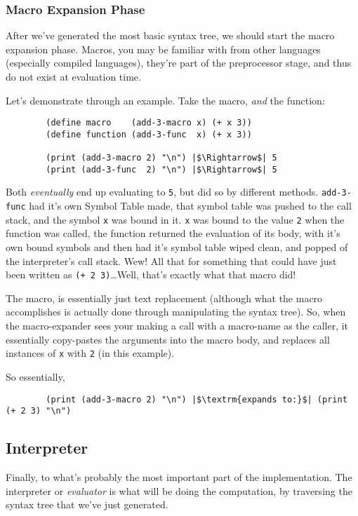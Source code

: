 \documentclass{article}
\newcommand{\code}[1]{\texttt{#1}}
\begin{document}
      \clearpage

      \subsubsection{Macro Expansion Phase}
      After we've generated the most basic syntax tree, we should start the macro
      expansion phase.  Macros, you may be familiar with from other languages
      (especially compiled languages), they're part of the preprocessor stage,
      and thus do not exist at evaluation time.

      Let's demonstrate through an example. Take the macro, \emph{and} the function:

      \begin{verbatim}
        (define macro    (add-3-macro x) (+ x 3))
        (define function (add-3-func  x) (+ x 3))

        (print (add-3-macro 2) "\n") |$\Rightarrow$| 5
        (print (add-3-func  2) "\n") |$\Rightarrow$| 5
      \end{verbatim}

      Both \emph{eventually} end up evaluating to \code{5}, but did so by different
      methods. \code{add-3-func} had it's own Symbol Table made, that symbol table
      was pushed to the call stack, and the symbol \code{x} was bound in it.
      \code{x} was bound to the value \code{2} when the function was called, the
      function returned the evaluation of its body, with it's own bound symbols
      and then had it's symbol table wiped clean, and popped of the interpreter's
      call stack. Wew! All that for something that could have just been written
      as \code{(+ 2 3)}\ldots Well, that's exactly what that macro did!

      The macro, is essentially just text replacement (although what the macro
      accomplishes is actually done through manipulating the syntax tree).
      So, when the macro-expander sees your making a call with a macro-name as the
      caller, it essentially copy-pastes the arguments into the macro body, and
      replaces all instances of \code{x} with \code{2} (in this example).

      So essentially,
      \begin{verbatim}
        (print (add-3-macro 2) "\n") |$\textrm{expands to:}$| (print (+ 2 3) "\n")
      \end{verbatim}

  \subsection{Interpreter}
    Finally, to what's probably the most important part of the implementation.
    The interpreter or \emph{evaluator} is what will be doing the computation,
    by traversing the syntax tree that we've just generated.
\end{document}
